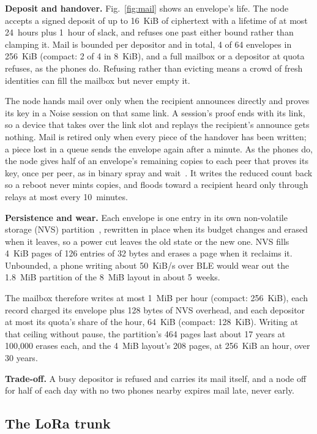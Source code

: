 \documentclass[conference]{IEEEtran}
\begin{document}
\textbf{Deposit and handover.} Fig.~\ref{fig:mail} shows an envelope's life. The node accepts a signed deposit of up to 16~KiB of ciphertext with a lifetime of at most 24~hours plus 1~hour of slack, and refuses one past either bound rather than clamping it. Mail is bounded per depositor and in total, 4 of 64 envelopes in 256~KiB (compact: 2 of 4 in 8~KiB), and a full mailbox or a depositor at quota refuses, as the phones do. Refusing rather than evicting means a crowd of fresh identities can fill the mailbox but never empty it.

The node hands mail over only when the recipient announces directly and proves its key in a Noise session on that same link. A session's proof ends with its link, so a device that takes over the link slot and replays the recipient's announce gets nothing. Mail is retired only when every piece of the handover has been written; a piece lost in a queue sends the envelope again after a minute. As the phones do, the node gives half of an envelope's remaining copies to each peer that proves its key, once per peer, as in binary spray and wait~\cite{spyropoulos2005}. It writes the reduced count back so a reboot never mints copies, and floods toward a recipient heard only through relays at most every 10~minutes.

\textbf{Persistence and wear.} Each envelope is one entry in its own non-volatile storage (NVS) partition~\cite{espidf_nvs}, rewritten in place when its budget changes and erased when it leaves, so a power cut leaves the old state or the new one. NVS fills 4~KiB pages of 126 entries of 32 bytes and erases a page when it reclaims it. Unbounded, a phone writing about 50~KiB/s over BLE would wear out the 1.8~MiB partition of the 8~MiB layout in about 5~weeks.

The mailbox therefore writes at most 1~MiB per hour (compact: 256~KiB), each record charged its envelope plus 128 bytes of NVS overhead, and each depositor at most its quota's share of the hour, 64~KiB (compact: 128~KiB). Writing at that ceiling without pause, the partition's 464 pages last about 17 years at 100{,}000 erases each, and the 4~MiB layout's 208 pages, at 256~KiB an hour, over 30 years.

\textbf{Trade-off.} A busy depositor is refused and carries its mail itself, and a node off for half of each day with no two phones nearby expires mail late, never early.

\subsection{The LoRa trunk}
\label{sec:trunk}
\end{document}
